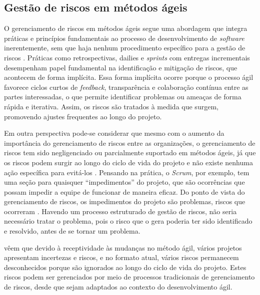\documentclass[
	12pt,
	openright,
	twoside,
	a4paper,
	english,
	brazil
	]{abntex2}
\begin{document}
\subsection{Gestão de riscos em métodos ágeis}

O gerenciamento de riscos em métodos ágeis segue uma abordagem que integra práticas e princípios fundamentais ao processo de desenvolvimento de \textit{software} inerentemente, sem que haja nenhum procedimento específico para a gestão de riscos \cite{Gold}. Práticas como retrospectivas, dailies e \textit{sprints} com entregas incrementais desempenham papel fundamental na identificação e mitigação de riscos, que acontecem de forma implícita. Essa forma implícita ocorre porque o processo ágil favorece ciclos curtos de \textit{feedback}, transparência e colaboração contínua entre as partes interessadas, o que permite identificar problemas ou ameaças de forma rápida e iterativa. Assim, os riscos são tratados à medida que surgem, promovendo ajustes frequentes ao longo do projeto.

Em outra perspectiva pode-se considerar que mesmo com o aumento da importância do gerenciamento de riscos entre as organizações, o gerenciamento de riscos tem sido negligenciado ou parcialmente suportado em métodos ágeis, já que os riscos podem surgir ao longo do ciclo de vida do projeto e não existe nenhuma ação específica para evitá-los \cite{LopesSamueldeSouza2022ARMF}. Pensando na prática, o \textit{Scrum}, por exemplo, tem uma seção para quaisquer “impedimentos” do projeto, que são ocorrências que possam impedir a equipe de funcionar de maneira eficaz. Do ponto de vista do gerenciamento de riscos, os impedimentos do projeto são problemas, riscos que ocorreram \cite{Gold}. Havendo um processo estruturado de gestão de riscos, não seria necessário tratar o problema, pois o risco que o gera poderia ter sido identificado e resolvido, antes de se tornar um problema.

 vêem que devido à receptividade às mudanças no método ágil, vários projetos apresentam incertezas e riscos, e no formato atual, vários riscos permanecem desconhecidos porque são ignorados ao longo do ciclo de vida do projeto. Estes riscos podem ser gerenciados por meio de processos tradicionais de gerenciamento de riscos, desde que sejam adaptados ao contexto do desenvolvimento ágil.
\end{document}
